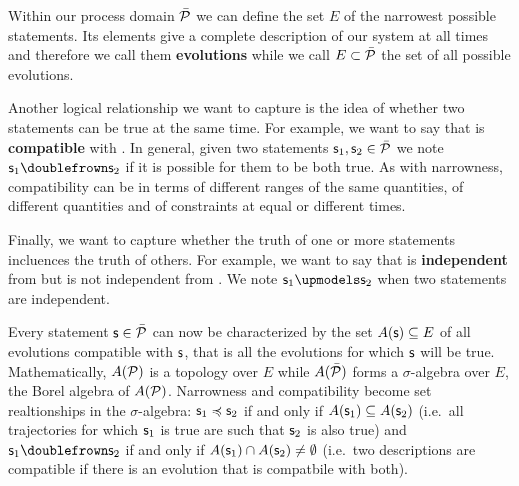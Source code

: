 \documentclass[letterpaper]{article}
\begin{document}
Within our process domain $\tdomain[P]$ we can define the set $E$ of the narrowest possible statements. Its elements give a complete description of our system at all times and therefore we call them \textbf{evolutions} while we call $E \subset \tdomain[P]$ the set of all possible evolutions.

Another logical relationship we want to capture is the idea of whether two statements can be true at the same time. For example, we want to say that  is \textbf{compatible} with . In general, given two statements $\stmt_1, \stmt_2 \in \tdomain[P]$ we note $\stmt_1 \comp \stmt_2$ if it is possible for them to be both true. As with narrowness, compatibility can be in terms of different ranges of the same quantities, of different quantities and of constraints at equal or different times.

Finally, we want to capture whether the truth of one or more statements incluences the truth of others. For example, we want to say that  is \textbf{independent} from  but is not independent from . We note $\stmt_1 \indep \stmt_2$ when two statements are independent.

Every statement $\stmt \in \tdomain[P]$ can now be characterized by the set $A(\stmt) \subseteq E$ of all evolutions compatible with $\stmt$, that is all the evolutions for which $\stmt$ will be true. Mathematically,  $A(\edomain[P])$ is a topology over $E$ while $A(\tdomain[P])$ forms a $\sigma$-algebra over $E$, the Borel algebra of $A(\edomain[P])$. Narrowness and compatibility become set realtionships in the $\sigma$-algebra: $\stmt_1 \narrower \stmt_2$ if and only if $A(\stmt_1) \subseteq A(\stmt_2)$ (i.e.~all trajectories for which $\stmt_1$ is true are such that $\stmt_2$ is also true) and $\stmt_1 \comp \stmt_2$ if and only if $A(\stmt_1) \cap A(\stmt_2) \neq \emptyset$ (i.e.~two descriptions are compatible if there is an evolution that is compatbile with both).
\end{document}
